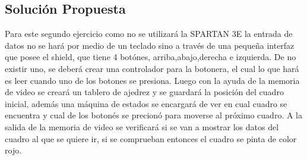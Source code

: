 \documentclass[10pt]{article}
\begin{document}
\subsection*{Solución Propuesta}
Para este segundo ejercicio como no se utilizará la SPARTAN 3E la entrada de datos no se hará por medio de un teclado sino a través de una pequeña interfaz que posee el shield, que tiene 4 botónes, arriba,abajo,derecha e izquierda.
De no existir uno, se deberá crear una controlador para la botonera, el cual lo que hará es leer cuando uno de los botones se presiona.
Luego con la ayuda de la memoria de video se creará un tablero de ajedrez y se guardará la posición del cuadro inicial, además una máquina de estados se encargará de ver en cual cuadro se encuentra y cual de los botonés se precionó para moverse al próximo cuadro. A la salida de la memoria de video se verificará si se van a mostrar los datos del cuadro al que se quiere ir, si se comprueban entonces el cuadro se pinta de color rojo.
\end{document}
